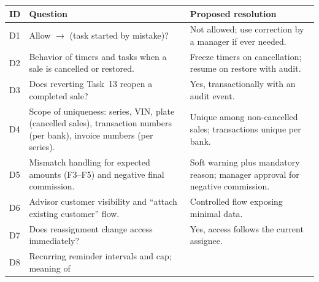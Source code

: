 \documentclass[11pt,a4paper]{article}
\newcommand{\code}[1]{\texttt{\detokenize{#1}}}
\begin{document}
\begin{longtable}{@{}L{1.0cm}L{8.2cm}L{6.6cm}@{}}
	\toprule
	\textbf{ID}                                                         &
	\textbf{Question}
	                                                                    &
	\textbf{Proposed
		resolution}
	\\
	\midrule
	\endhead
	D1                                                                  & Allow
	\code{in_progress} $\rightarrow$
	\code{pending}
	(task started by mistake)?                                          & Not
	allowed; use correction by a manager if ever needed.
	\\
	D2                                                                  & Behavior
	of timers and
	tasks when a sale is cancelled or
	restored.                                                           & Freeze
	timers
	on cancellation; resume on restore with audit.
	\\
	D3                                                                  & Does
	reverting Task~13 reopen a completed sale?
	                                                                    & Yes,
	transactionally with
	an audit event.
	\\
	D4                                                                  & Scope of
	uniqueness:
	series, VIN, plate (cancelled sales), transaction numbers (per bank), invoice
	numbers (per series).                                               & Unique
	among non-cancelled
	sales; transactions unique
	per bank.
	\\
	D5                                                                  & Mismatch
	handling for expected amounts (F3--F5) and negative
	final commission.                                                   & Soft
	warning
	plus
	mandatory reason; manager approval for negative commission.
	\\
	D6                                                                  & Advisor
	customer visibility
	and ``attach existing
	customer''
	flow.                                                               &
	Controlled flow
	exposing minimal data.
	\\
	D7                                                                  & Does
	reassignment change
	access immediately?
	                                                                    & Yes,
	access
	follows the
	current assignee.
	\\
	D8                                                                  &
	Recurring reminder
	intervals and cap; meaning of

\end{longtable}
\end{document}
